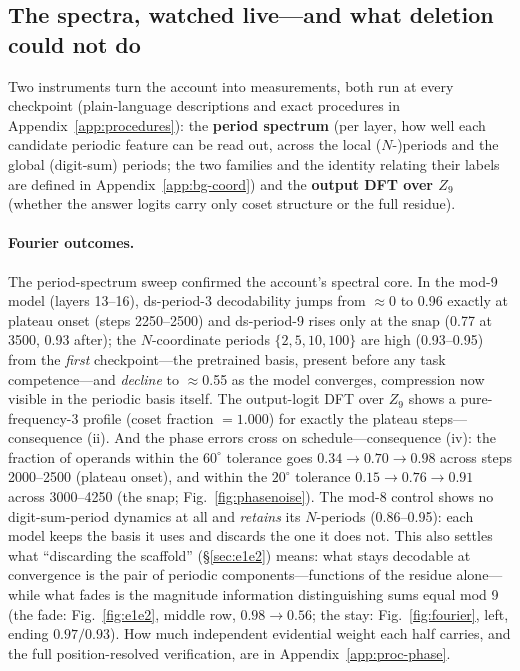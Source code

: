 \documentclass{article} %
\begin{document}
\subsection{The spectra, watched live---and what deletion could not do}
\label{sec:instruments}

Two instruments turn the account into measurements, both run at every checkpoint (plain-language descriptions and exact procedures in Appendix~\ref{app:procedures}): the \textbf{period spectrum} (per layer, how well each candidate periodic feature can be read out, across the local ($N$-)periods and the global (digit-sum) periods; the two families and the identity relating their labels are defined in Appendix~\ref{app:bg-coord}) and the \textbf{output DFT over $Z_9$} (whether the answer logits carry only coset structure or the full residue).

\paragraph{Fourier outcomes.} The period-spectrum sweep confirmed the account's spectral core. In the mod-9 model (layers 13--16), ds-period-3 decodability jumps from $\approx 0$ to 0.96 exactly at plateau onset (steps 2250--2500) and ds-period-9 rises only at the snap (0.77 at 3500, 0.93 after); the $N$-coordinate periods $\{2,5,10,100\}$ are high (0.93--0.95) from the \emph{first} checkpoint---the pretrained basis, present before any task competence---and \emph{decline} to $\approx$0.55 as the model converges, compression now visible in the periodic basis itself. The output-logit DFT over $Z_9$ shows a pure-frequency-3 profile (coset fraction $= 1.000$) for exactly the plateau steps---consequence (ii). And the phase errors cross on schedule---consequence (iv): the fraction of operands within the $60^\circ$ tolerance goes $0.34 \to 0.70 \to 0.98$ across steps 2000--2500 (plateau onset), and within the $20^\circ$ tolerance $0.15 \to 0.76 \to 0.91$ across 3000--4250 (the snap; Fig.~\ref{fig:phasenoise}). The mod-8 control shows no digit-sum-period dynamics at all and \emph{retains} its $N$-periods (0.86--0.95): each model keeps the basis it uses and discards the one it does not. This also settles what ``discarding the scaffold'' (\S\ref{sec:e1e2}) means: what stays decodable at convergence is the pair of periodic components---functions of the residue alone---while what fades is the magnitude information distinguishing sums equal mod 9 (the fade: Fig.~\ref{fig:e1e2}, middle row, $0.98 \to 0.56$; the stay: Fig.~\ref{fig:fourier}, left, ending $0.97/0.93$). How much independent evidential weight each half carries, and the full position-resolved verification, are in Appendix~\ref{app:proc-phase}.
\end{document}
